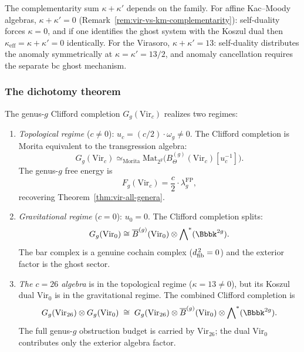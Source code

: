 \begin{remark}
\label{rem:g9-complementarity-constraint}
The complementarity sum $\kappa + \kappa'$ depends on the
family. For affine Kac--Moody algebras,
$\kappa + \kappa' = 0$
(Remark~\ref{rem:vir-vs-km-complementarity}):
self-duality forces $\kappa = 0$, and if one identifies the
ghost system with the Koszul dual then
$\kappa_{\mathrm{eff}} = \kappa + \kappa' = 0$
identically. For the Virasoro, $\kappa + \kappa' = 13$:
self-duality distributes the anomaly symmetrically at
$\kappa = \kappa' = 13/2$, and anomaly cancellation
requires the separate bc ghost mechanism.
\end{remark}

\subsubsection{The dichotomy theorem}
\label{subsubsec:dichotomy-theorem}

\begin{theorem}
\label{thm:critical-string-dichotomy}
The genus-$g$ Clifford completion $G_g(\mathrm{Vir}_c)$ realizes two
regimes:

\begin{enumerate}[label=\textup{(\roman*)}]
\item \emph{Topological regime} ($c \neq 0$):\;
$u_c = (c/2) \cdot \omega_g \neq 0$. The Clifford completion is
Morita equivalent to the transgression algebra:
\[
G_g(\mathrm{Vir}_c)
\simeq_{\mathrm{Morita}}
\mathrm{Mat}_{2^g}\bigl(B_\Theta^{(g)}(\mathrm{Vir}_c)[u_c^{-1}]\bigr).
\]
The genus-$g$ free energy is
\begin{equation}\label{eq:g9-partition-topo}
F_g(\mathrm{Vir}_c)
= \frac{c}{2} \cdot \lambda_g^{\mathrm{FP}},
\end{equation}
recovering Theorem~\ref{thm:vir-all-genera}.

\item \emph{Gravitational regime} ($c = 0$):\;
$u_0 = 0$. The Clifford completion splits:
\[
G_g(\mathrm{Vir}_0)
\cong
\barB^{(g)}(\mathrm{Vir}_0)
\otimes \bigwedge\nolimits^*(\Bbbk^{2g}).
\]
The bar complex is a genuine cochain complex ($d_{\mathrm{fib}}^{\,2} = 0$)
and the exterior factor is the ghost sector.

\item \emph{The $c = 26$ algebra}\/ is in the topological regime
($\kappa = 13 \neq 0$), but its Koszul dual $\mathrm{Vir}_0$ is in
the gravitational regime. The combined Clifford completion is
\begin{equation}\label{eq:g9-combined-clifford}
G_g(\mathrm{Vir}_{26}) \otimes G_g(\mathrm{Vir}_0)
\;\cong\;
G_g(\mathrm{Vir}_{26})
\otimes \barB^{(g)}(\mathrm{Vir}_0)
\otimes \bigwedge\nolimits^*(\Bbbk^{2g}).
\end{equation}
The full genus-$g$ obstruction budget is carried by
$\mathrm{Vir}_{26}$; the dual $\mathrm{Vir}_0$ contributes only the
exterior algebra factor.
\end{enumerate}
\end{theorem}

